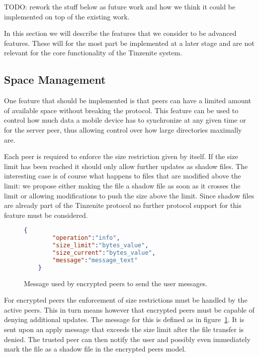 TODO: rework the stuff below as future work and how we think it could be implemented on top of the existing work.

In this section we will describe the features that we consider to be advanced features.
These will for the most part be implemented at a later stage and are not relevant for the core functionality of the Tinzenite system.

\subsection{Space Management}
\label{sub:Space Management}

One feature that should be implemented is that peers can have a limited amount of available space without breaking the protocol.
This feature can be used to control how much data a mobile device has to synchronize at any given time or for the server peer, thus allowing control over how large directories maximally are.

Each peer is required to enforce the size restriction given by itself.
If the size limit has been reached it should only allow further updates as shadow files.
The interesting case is of course what happens to files that are modified above the limit: we propose either making the file a shadow file as soon as it crosses the limit or allowing modifications to push the size above the limit.
Since shadow files are already part of the Tinzenite protocol no further protocol support for this feature must be considered.

\begin{figure}[htp]
    \begin{lstlisting}[language=json,firstnumber=0]
    {
        "operation":"info",
        "size_limit":"bytes_value",
        "size_current":"bytes_value",
        "message":"message_text"
    }
    \end{lstlisting}
\caption[Information Message]{Message used by encrypted peers to send the user messages.}
\label{json:info_message}
\end{figure}

For encrypted peers the enforcement of size restrictions must be handled by the active peers.
This in turn means however that encrypted peers must be capable of denying additional updates.
The message for this is defined as in figure~\ref{json:info_message}.
It is sent upon an apply message that exceeds the size limit after the file transfer is denied.
The trusted peer can then notify the user and possibly even immediately mark the file as a shadow file in the encrypted peers model.

